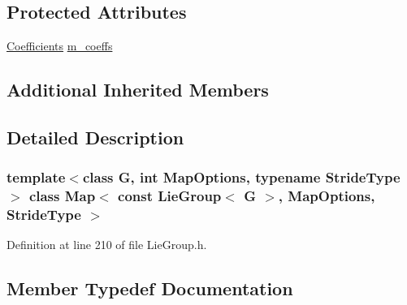 \subsection*{Protected Attributes}
\begin{DoxyCompactItemize}
\item 
\hyperlink{class_map_3_01const_01_lie_group_3_01_g_01_4_00_01_map_options_00_01_stride_type_01_4_a670729f8e6ab1131541ef46da7d09274}{Coefficients} \hyperlink{class_map_3_01const_01_lie_group_3_01_g_01_4_00_01_map_options_00_01_stride_type_01_4_a3dcc1fda9634e88e41a81209f408a8e8}{m\+\_\+coeffs}
\end{DoxyCompactItemize}
\subsection*{Additional Inherited Members}


\subsection{Detailed Description}
\subsubsection*{template$<$class G, int Map\+Options, typename Stride\+Type$>$\newline
class Map$<$ const Lie\+Group$<$ G $>$, Map\+Options, Stride\+Type $>$}



Definition at line 210 of file Lie\+Group.\+h.



\subsection{Member Typedef Documentation}
\hypertarget{class_map_3_01const_01_lie_group_3_01_g_01_4_00_01_map_options_00_01_stride_type_01_4_ae8127dbfe0e6b6b515d319062f495883}{}\label{class_map_3_01const_01_lie_group_3_01_g_01_4_00_01_map_options_00_01_stride_type_01_4_ae8127dbfe0e6b6b515d319062f495883} 
